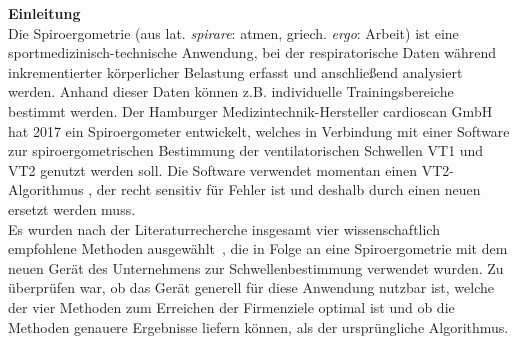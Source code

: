 \textbf{\Large Einleitung}\\

Die Spiroergometrie (aus lat. \textsl{spirare}: atmen, griech. \textsl{ergo}: Arbeit) ist eine sportmedizinisch-technische Anwendung, bei der respiratorische Daten während inkrementierter körperlicher Belastung erfasst und anschließend analysiert werden. Anhand dieser Daten können z.B. individuelle Trainingsbereiche bestimmt werden. Der Hamburger Medizintechnik-Hersteller cardioscan GmbH hat 2017 ein Spiroergometer entwickelt, welches in Verbindung mit einer Software zur spiroergometrischen Bestimmung der ventilatorischen Schwellen VT1 und VT2 genutzt werden soll. Die Software verwendet momentan einen VT2-Algorithmus , der recht sensitiv für Fehler ist und deshalb durch einen neuen ersetzt werden muss.\\
Es wurden nach der Literaturrecherche insgesamt vier wissenschaftlich empfohlene Methoden ausgewählt~\cite{Westhoff.2012}, die in Folge an eine Spiroergometrie mit dem neuen Gerät des Unternehmens zur Schwellenbestimmung verwendet wurden. Zu überprüfen war, ob das Gerät generell für diese Anwendung nutzbar ist, welche der vier Methoden zum Erreichen der Firmenziele optimal ist und ob die Methoden genauere Ergebnisse liefern können, als der ursprüngliche Algorithmus.\\





